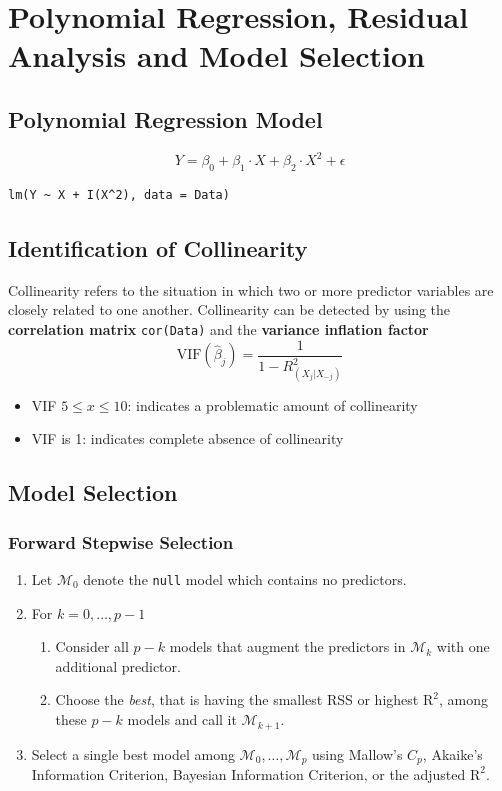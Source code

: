 \documentclass[11pt]{article}
\begin{document}
\section{Polynomial Regression, Residual Analysis and Model Selection}

\subsection{Polynomial Regression Model}

\begin{equation*}
	Y = \beta_0 + \beta_1\cdot X + \beta_2\cdot X^2 + \epsilon
\end{equation*}

\begin{verbatim}
lm(Y ~ X + I(X^2), data = Data)
\end{verbatim}

\subsection{Identification of Collinearity}
Collinearity refers to the situation in which two or more predictor variables are closely related to one another. Collinearity can be detected by using the \textbf{correlation matrix} \texttt{cor(Data)} and the \textbf{variance inflation factor}
\begin{equation*}
	\text{VIF}(\hat{\beta}_j) = \frac{1}{1- R_{(X_j|X_{-j})}^2}
\end{equation*}
\begin{itemize}
	\item VIF $5\leq x\leq 10$: indicates a problematic amount of collinearity
	\item VIF is 1: indicates complete absence of collinearity
\end{itemize}

\subsection{Model Selection}
\subsubsection{Forward Stepwise Selection}
\begin{enumerate}
	\item Let $\mathcal{M}_0$ denote the \texttt{null} model which contains no predictors.
	\item For $k = 0,\dots,p-1$
	\begin{enumerate}
		\item Consider all $p - k$ models that augment the predictors in $\mathcal{M}_k$ with one additional predictor.
		\item Choose the \emph{best}, that is having the smallest RSS or highest $\text{R}^2$, among these $p-k$ models and call it $\mathcal{M}_{k+1}$.
	\end{enumerate}
	\item Select a single best model among $\mathcal{M}_0,\dots, \mathcal{M}_p$ using Mallow's $C_p$, Akaike's Information Criterion, Bayesian Information Criterion, or the adjusted $\text{R}^2$.
\end{enumerate}
\end{document}

